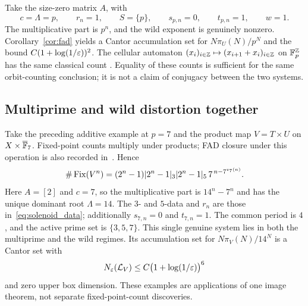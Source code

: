 Take the size-zero matrix $A$, with
\[
 c=\Lambda=p,\qquad r_n=1,\qquad S=\{p\},\qquad
 s_{p,n}=0,\qquad t_{p,n}=1,\qquad w=1.
\]
The multiplicative part is $p^n$, and the wild exponent is genuinely
nonzero. Corollary~\ref{cor:fad} yields a Cantor accumulation set for
$N\pi_U(N)/p^N$ and the bound $C(1+\log(1/\varepsilon))^2$.
The cellular automaton $(x_i)_{i\in\mathbb Z}\mapsto(x_{i+1}+x_i)_{i\in\mathbb Z}$
on $\mathbb F_p^{\mathbb Z}$ has the same classical count
\cite[Example 7.2.6]{bch2024}. Equality of these counts is sufficient for
the same orbit-counting conclusion; it is not a claim of conjugacy between
the two systems.

\subsection{Multiprime and wild distortion together}

Take the preceding additive example at $p=7$ and the product map
$V=T\times U$ on $X\times\overline{\mathbb F}_7$. Fixed-point counts multiply
under products; FAD closure under this operation is also recorded
in~\cite[Example 7.1.3]{bch2024}. Hence
\begin{equation}\label{eq:product_count}
 \#\operatorname{Fix}(V^n)=(2^n-1)|2^n-1|_3|2^n-1|_5\,7^{\,n-7^{v_7(n)}}.
\end{equation}
Here $A=[2]$ and $c=7$, so the multiplicative part is $14^n-7^n$ and
has the unique dominant root $\Lambda=14$. The $3$- and $5$-data and
$r_n$ are those in~\eqref{eq:solenoid_data}; additionally
$s_{7,n}=0$ and $t_{7,n}=1$. The common period is $4$, and the active
prime set is $\{3,5,7\}$.
This single genuine system lies in both the multiprime and the wild
regimes. Its accumulation set for $N\pi_V(N)/14^N$ is a Cantor set with
\[
 N_{\varepsilon}(\mathcal L_V)\leq C\bigl(1+\log(1/\varepsilon)\bigr)^6
\]
and zero upper box dimension. These examples are applications of one
image theorem, not separate fixed-point-count discoveries.

